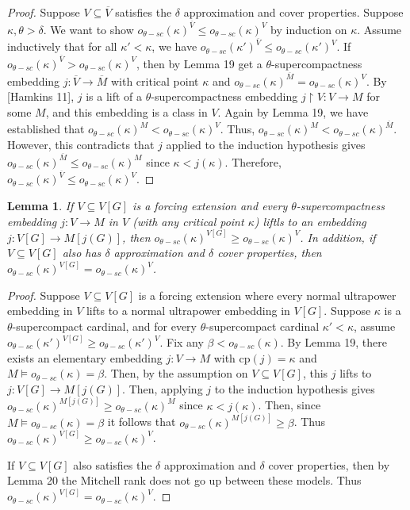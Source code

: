 \documentclass[10pt,leqno]{amsart}
\newtheorem{lemma}[theorem]{Lemma}
\begin{document}
\begin{proof} Suppose $V \subseteq \overline{V}$ satisfies the $\delta$ approximation and cover properties. Suppose $\kappa, \theta > \delta$. We want to show $o_{\theta-sc}(\kappa)^{\overline{V}} \le o_{\theta-sc}(\kappa)^V$ by induction on $\kappa$. Assume inductively that for all $\kappa' < \kappa$, we have $o_{\theta-sc}(\kappa')^{\overline{V}} \le o_{\theta-sc}(\kappa')^V$. If $o_{\theta-sc}(\kappa)^{\overline{V}} > o_{\theta-sc}(\kappa)^V$, then by Lemma 19 get a $\theta$-supercompactness embedding $j:\overline{V} \to \overline{M}$ with critical point $\kappa$ and $o_{\theta-sc}(\kappa)^{\overline{M}} = o_{\theta-sc}(\kappa)^V$. By [Hamkins 11], $j$ is a lift of a $\theta$-supercompactness embedding $j \upharpoonright V : V \to M$ for some $M$, and this embedding is a class in $V$. Again by Lemma 19, we have established that $o_{\theta-sc}(\kappa)^M < o_{\theta-sc}(\kappa)^V$. Thus, $o_{\theta-sc}(\kappa)^M < o_{\theta-sc}(\kappa)^{\overline{M}}$. However, this contradicts that $j$ applied to the induction hypothesis gives $o_{\theta-sc}(\kappa)^{\overline{M}} \le o_{\theta-sc}(\kappa)^M$ since $\kappa < j(\kappa)$. Therefore, $o_{\theta-sc}(\kappa)^{\overline{V}} \le o_{\theta-sc}(\kappa)^V$.
\end{proof}

\begin{lemma} If $V \subseteq V[G]$ is a forcing extension and every $\theta$-supercompactness embedding $j:V \to M$ in $V$ (with any critical point $\kappa$) liftls to an embedding $j: V[G] \to M[j(G)]$, then $o_{\theta-sc}(\kappa)^{V[G]} \ge o_{\theta-sc}(\kappa)^V$. In addition, if $V \subseteq V[G]$ also has $\delta$ approximation and $\delta$ cover properties, then $o_{\theta-sc}(\kappa)^{V[G]} = o_{\theta-sc}(\kappa)^V$.
\end{lemma}

\begin{proof} Suppose $V \subseteq V[G]$ is a forcing extension where every normal ultrapower embedding in $V$ lifts to a normal ultrapower embedding in $V[G]$. Suppose $\kappa$ is a $\theta$-supercompact cardinal, and for every $\theta$-supercompact cardinal $\kappa' < \kappa$, assume $o_{\theta-sc}(\kappa')^{V[G]} \ge o_{\theta-sc}(\kappa')^V$. Fix any $\beta < o_{\theta-sc}(\kappa)$. By Lemma 19, there exists an elementary embedding $j:V \to M$ with cp$(j) = \kappa$ and $M \models o_{\theta-sc}(\kappa) = \beta$. Then, by the assumption on $V \subseteq V[G]$, this $j$ lifts to $j:V[G] \to M[j(G)]$. Then, applying $j$ to the induction hypothesis gives $o_{\theta-sc}(\kappa)^{M[j(G)]} \ge o_{\theta-sc}(\kappa)^M$ since $\kappa < j(\kappa)$. Then, since $M \models o_{\theta-sc}(\kappa) = \beta$ it follows that $o_{\theta-sc}(\kappa)^{M[j(G)]} \ge \beta$. Thus $o_{\theta-sc}(\kappa)^{V[G]} \ge o_{\theta-sc}(\kappa)^V$.

If $V \subseteq V[G]$ also satisfies the $\delta$ approximation and $\delta$ cover properties, then by Lemma 20 the Mitchell rank does not go up between these models. Thus $o_{\theta-sc}(\kappa)^{V[G]} = o_{\theta-sc}(\kappa)^V$.
\end{proof}
\end{document}
